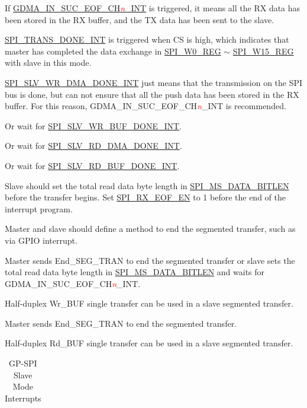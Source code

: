 \documentclass[main\_\_EN.tex]{subfiles}
\begin{document}
\begin{ThreePartTable}

\begin{TableNotes}
    \item[1] If \hyperref[int:GDMAINSUCEOFINT]{GDMA\_IN\_SUC\_EOF\_CH\textcolor{red}{\it{n}}\_INT} is triggered, it means all the RX data has been stored in the RX buffer, and the TX data has been sent to the slave.
    \item[2] \hyperref[int:SPITRANSDONEINT]{SPI\_TRANS\_DONE\_INT} is triggered when CS is high, which indicates that master has completed the data exchange in \hyperref[regdesc:SPIW0REG]{SPI\_W0\_REG} $\sim$ \hyperref[regdesc:SPIW15REG]{SPI\_W15\_REG} with slave in this mode.
    \item[3] \hyperref[int:SPISLVWRDMADONEINT]{SPI\_SLV\_WR\_DMA\_DONE\_INT} just means that the transmission on the SPI bus is done, but can not ensure that all the push data has been stored in the RX buffer. For this reason, GDMA\_IN\_SUC\_EOF\_CH\textcolor{red}{\it{n}}\_INT is recommended.
    \item[4] Or wait for \hyperref[int:SPISLVWRBUFDONEINT]{SPI\_SLV\_WR\_BUF\_DONE\_INT}.
    \item[5] Or wait for \hyperref[int:SPISLVRDDMADONEINT]{SPI\_SLV\_RD\_DMA\_DONE\_INT}.
    \item[6] Or wait for \hyperref[int:SPISLVRDBUFDONEINT]{SPI\_SLV\_RD\_BUF\_DONE\_INT}.
    \item[7] Slave should set the total read data byte length in \hyperref[fielddesc:SPIMSDATABITLEN]{SPI\_MS\_DATA\_BITLEN} before the transfer begins. Set \hyperref[fielddesc:SPIRXEOFEN]{SPI\_RX\_EOF\_EN} to 1 before the end of the interrupt program.
    \item[8] Master and slave should define a method to end the segmented transfer, such as via GPIO interrupt.
    \item[9] Master sends End\_SEG\_TRAN to end the segmented transfer or slave sets the total read data byte length in \hyperref[fielddesc:SPIMSDATABITLEN]{SPI\_MS\_DATA\_BITLEN} and waits for GDMA\_IN\_SUC\_EOF\_CH\textcolor{red}{\it{n}}\_INT.
    \item[10] Half-duplex Wr\_BUF single transfer can be used in a slave segmented transfer.
    \item[11] Master sends End\_SEG\_TRAN to end the segmented transfer.
    \item[12] Half-duplex Rd\_BUF single transfer can be used in a slave segmented transfer.
\end{TableNotes}
\begin{longtable}[c]{|l|l|l|l|}
\caption{GP-SPI Slave Mode Interrupts}
\label{Table:Slv_Int_Table}
\\\hline


\end{longtable}
\end{ThreePartTable}
\end{document}

